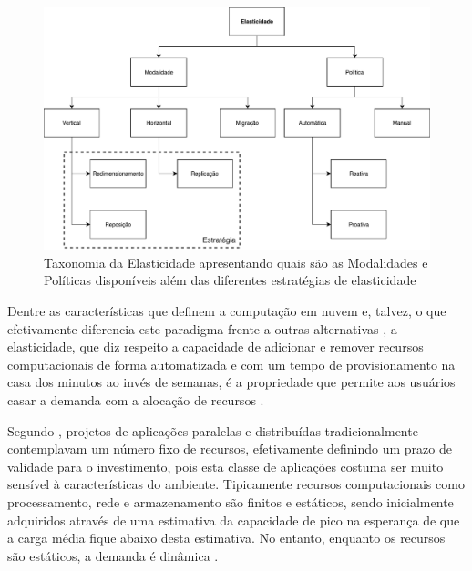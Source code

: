 \documentclass[english,brazilian]{UNISINOSmonografia} %
\newcommand\defaultFigureWidth{0.9}
\begin{document}
\begin{figure}[tb]
	\centering%
	\begin{minipage}{\defaultFigureWidth\textwidth}
		\caption{Taxonomia da Elasticidade apresentando quais são as Modalidades e Políticas disponíveis além das diferentes estratégias de elasticidade}
		\label{fig:elasticidade-taxonomia}
		\vspace{1ex}
		\includegraphics[clip,width=\textwidth]{AUTOELASTIC-taxonomia}
	\end{minipage}
\end{figure}


Dentre as características que definem a computação em nuvem e, talvez, o que efetivamente diferencia este paradigma frente a outras alternativas \cite{Galante2012}, a elasticidade, que diz respeito a capacidade de adicionar e remover recursos computacionais de forma automatizada e com um tempo de provisionamento na casa dos minutos ao invés de semanas, é a propriedade que permite aos usuários casar a demanda com a alocação de recursos \cite{Armbrust:EECS-2009-28,Raveendran2011,Imai2012,Suleiman2012}.

Segundo , projetos de aplicações paralelas e distribuídas tradicionalmente contemplavam um número fixo de recursos, efetivamente definindo um prazo de validade para o investimento, pois esta classe de aplicações costuma ser muito sensível à características do ambiente. 
Tipicamente recursos computacionais como processamento, rede e armazenamento são finitos e estáticos, sendo inicialmente adquiridos através de uma estimativa da capacidade de pico na esperança de que a carga média fique abaixo desta estimativa. No entanto, enquanto os recursos são estáticos, a demanda é dinâmica \cite{Marshall2010}.
\end{document}
